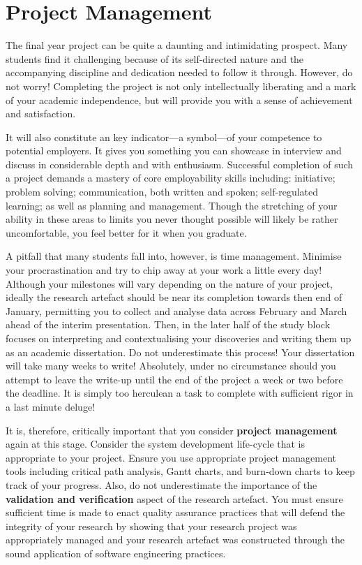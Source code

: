 \section*{Project Management}

The final year project can be quite a daunting and intimidating prospect. Many students find it challenging because of its self-directed nature and the accompanying discipline and dedication needed to follow it through. However, do not worry! Completing the project is not only intellectually liberating and a mark of your academic independence, but will provide you with a sense of achievement and satisfaction.

It will also constitute an key indicator---a symbol---of your competence to potential employers. It gives you something you can showcase in interview and discuss in considerable depth and with enthusiasm. Successful completion of such a project demands a mastery of core employability skills including: initiative; problem solving; communication, both written and spoken; self-regulated learning; as well as planning and management. Though the stretching of your ability in these areas to limits you never thought possible will likely be rather uncomfortable, you feel better for it when you graduate.

A pitfall that many students fall into, however, is time management. Minimise your procrastination and try to chip away at your work a little every day! Although your milestones will vary depending on the nature of your project, ideally the research artefact should be near its completion towards then end of January, permitting you to collect and analyse data across February and March ahead of the interim presentation. Then, in the later half of the study block focuses on interpreting and contextualising your discoveries and writing them up as an academic dissertation. Do not underestimate this process! Your dissertation will take many weeks to write! Absolutely, under no circumstance should you attempt to leave the write-up until the end of the project a week or two before the deadline. It is simply too herculean a task to complete with sufficient rigor in a last minute deluge!

It is, therefore, critically important that you consider \textbf{project management} again at this stage. Consider the system development life-cycle that is appropriate to your project. Ensure you use appropriate project management tools including critical path analysis, Gantt charts, and burn-down charts to keep track of your progress. Also, do not underestimate the importance of the \textbf{validation and verification} aspect of the research artefact. You must ensure sufficient time is made to enact quality assurance practices that will defend the integrity of your research by showing that your research project was appropriately managed and your research artefact was constructed through the sound application of software engineering practices. 

